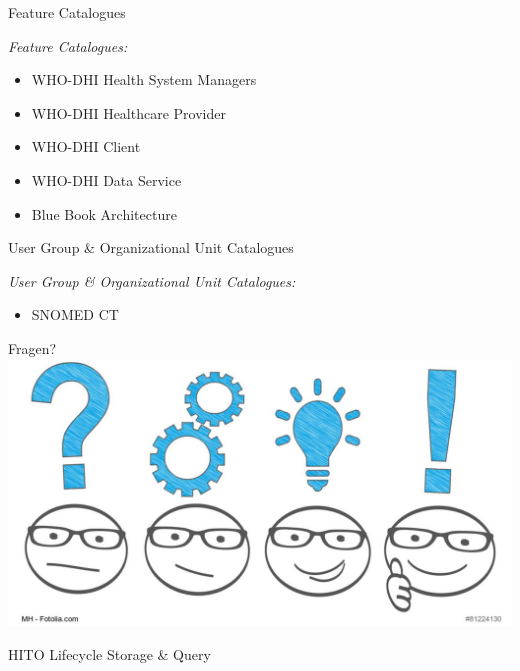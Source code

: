 \documentclass[aspectratio=1610,12pt]{beamer}
\begin{document}
\begin{frame}{Feature Catalogues}
\begin{spacing}{1.5}
  \emph{Feature Catalogues:}
  \begin{itemize}
    \item WHO-DHI Health System Managers
    \item WHO-DHI Healthcare Provider
    \item WHO-DHI Client
    \item WHO-DHI Data Service
    \item Blue Book Architecture
  \end{itemize}
  \end{spacing}
\end{frame}

\begin{frame}{User Group \& Organizational Unit Catalogues}
\begin{spacing}{1.5}
  \emph{User Group \& Organizational Unit Catalogues:}
  \begin{itemize}
    \item SNOMED CT
  \end{itemize}
  \end{spacing}
\end{frame}

\begin{frame}{Fragen?}
  \centering
  \vspace{-0.5cm}
  \includegraphics[width=\textwidth]{img/fragen.png}
\end{frame}

\begin{frame}{HITO Lifecycle Storage \& Query}
 \centering
  \vspace{-0.5cm}
\end{frame}
\end{document}
